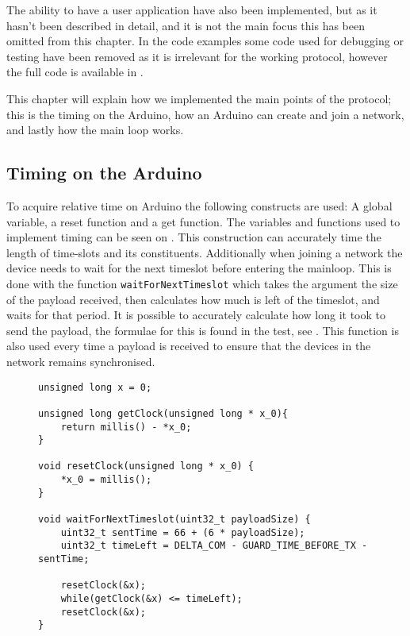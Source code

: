 \noindent
The ability to have a user application have also been implemented, but as it hasn't been described in detail, and it is not the main focus this has been omitted from this chapter.
In the code examples some code used for debugging or testing have been removed as it is irrelevant for the working protocol, however the full code is available in . 

This chapter will explain how we implemented the main points of the protocol; this is the timing on the Arduino, how an Arduino can create and join a network, and lastly how the main loop works. 

\subsection{Timing on the Arduino}
To acquire relative time on Arduino the following constructs are used: A global variable, a reset function and a get function.
The variables and functions used to implement timing can be seen on .
This construction can accurately time the length of time-slots and its constituents. 
Additionally when joining a network the device needs to wait for the next timeslot before entering the mainloop. 
This is done with the function \texttt{waitForNextTimeslot} which takes the argument the size of the payload received, then calculates how much is left of the timeslot, and waits for that period. 
It is possible to accurately calculate how long it took to send the payload, the formulae for this is found in the test, see  .
This function is also used every time a payload is received to ensure that the devices in the network remains synchronised. 

\begin{figure}
\begin{lstlisting}[style=customc,caption={The variables and functions used to implement timing.},label={lst:ccrc:timing}]
unsigned long x = 0;

unsigned long getClock(unsigned long * x_0){
    return millis() - *x_0;
}

void resetClock(unsigned long * x_0) {
    *x_0 = millis();
}

void waitForNextTimeslot(uint32_t payloadSize) {
    uint32_t sentTime = 66 + (6 * payloadSize);
    uint32_t timeLeft = DELTA_COM - GUARD_TIME_BEFORE_TX - sentTime;

    resetClock(&x);
    while(getClock(&x) <= timeLeft);
    resetClock(&x);
}

\end{lstlisting}
\vspace{-20pt}
\end{figure}
